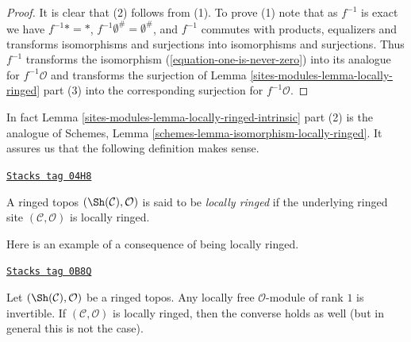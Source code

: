 \begin{proof}
It is clear that (2) follows from (1). To prove (1) note that
as $f^{-1}$ is exact we have $f^{-1}* = *$,
$f^{-1}\emptyset^\# = \emptyset^\#$, and $f^{-1}$ commutes with
products, equalizers and transforms isomorphisms and surjections
into isomorphisms and surjections. Thus $f^{-1}$ transforms the
isomorphism (\ref{equation-one-is-never-zero}) into
its analogue for $f^{-1}\mathcal{O}$ and transforms the surjection of
Lemma \ref{sites-modules-lemma-locally-ringed} part (3)
into the corresponding surjection for $f^{-1}\mathcal{O}$.
\end{proof}

In fact
Lemma \ref{sites-modules-lemma-locally-ringed-intrinsic} part (2)
is the analogue of
Schemes, Lemma \ref{schemes-lemma-isomorphism-locally-ringed}.
It assures us that the following definition makes sense.

\begin{definition}
\label{sites-modules-definition-locally-ringed-topos}
\href{https://stacks.math.columbia.edu/tag/04H8}{\texttt{Stacks tag 04H8}}

A ringed topos $(\Sh(\mathcal{C}), \mathcal{O})$ is said to be
{\it locally ringed} if the underlying ringed site
$(\mathcal{C}, \mathcal{O})$ is locally ringed.
\end{definition}

Here is an example of a consequence of being locally ringed.

\begin{lemma}
\label{sites-modules-lemma-invertible-is-locally-free-rank-1}
\href{https://stacks.math.columbia.edu/tag/0B8Q}{\texttt{Stacks tag 0B8Q}}

Let $(\Sh(\mathcal{C}), \mathcal{O})$ be a ringed topos. Any locally free
$\mathcal{O}$-module of rank $1$ is invertible.
If $(\mathcal{C}, \mathcal{O})$ is locally ringed, then
the converse holds as well (but in general this is not the case).
\end{lemma}

